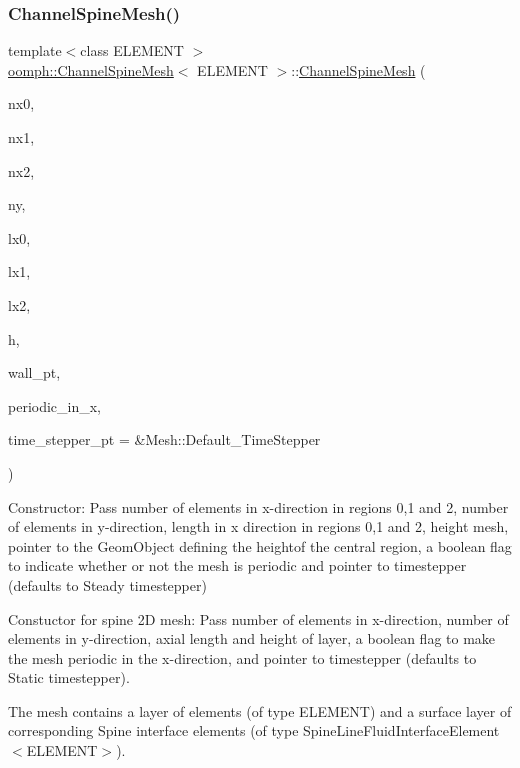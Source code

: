 \subsubsection{\texorpdfstring{Channel\+Spine\+Mesh()}{ChannelSpineMesh()}\hspace{0.1cm}{\footnotesize\ttfamily [2/2]}}
{\footnotesize\ttfamily template$<$class E\+L\+E\+M\+E\+NT $>$ \\
\hyperlink{classoomph_1_1ChannelSpineMesh}{oomph\+::\+Channel\+Spine\+Mesh}$<$ E\+L\+E\+M\+E\+NT $>$\+::\hyperlink{classoomph_1_1ChannelSpineMesh}{Channel\+Spine\+Mesh} (\begin{DoxyParamCaption}\item[{const unsigned \&}]{nx0,  }\item[{const unsigned \&}]{nx1,  }\item[{const unsigned \&}]{nx2,  }\item[{const unsigned \&}]{ny,  }\item[{const double \&}]{lx0,  }\item[{const double \&}]{lx1,  }\item[{const double \&}]{lx2,  }\item[{const double \&}]{h,  }\item[{Geom\+Object $\ast$}]{wall\+\_\+pt,  }\item[{const bool \&}]{periodic\+\_\+in\+\_\+x,  }\item[{Time\+Stepper $\ast$}]{time\+\_\+stepper\+\_\+pt = {\ttfamily \&Mesh\+:\+:Default\+\_\+TimeStepper} }\end{DoxyParamCaption})}



Constructor\+: Pass number of elements in x-\/direction in regions 0,1 and 2, number of elements in y-\/direction, length in x direction in regions 0,1 and 2, height mesh, pointer to the Geom\+Object defining the heightof the central region, a boolean flag to indicate whether or not the mesh is periodic and pointer to timestepper (defaults to Steady timestepper) 

Constuctor for spine 2D mesh\+: Pass number of elements in x-\/direction, number of elements in y-\/direction, axial length and height of layer, a boolean flag to make the mesh periodic in the x-\/direction, and pointer to timestepper (defaults to Static timestepper).

The mesh contains a layer of elements (of type E\+L\+E\+M\+E\+NT) and a surface layer of corresponding Spine interface elements (of type Spine\+Line\+Fluid\+Interface\+Element$<$\+E\+L\+E\+M\+E\+N\+T$>$). 

